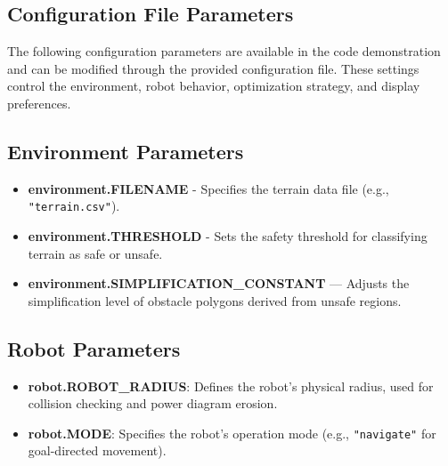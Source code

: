 \begin{appendices}




\chapter{Configuration File Parameters}

The following configuration parameters are available in the code demonstration and can be modified through the provided configuration file. These settings control the environment, robot behavior, optimization strategy, and display preferences.

\section*{Environment Parameters}
\begin{itemize}
    \item \textbf{environment.FILENAME} - Specifies the terrain data file (e.g., \texttt{"terrain.csv"}).
    \item \textbf{environment.THRESHOLD} - Sets the safety threshold for classifying terrain as safe or unsafe.
    \item \textbf{environment.SIMPLIFICATION\_CONSTANT} — Adjusts the simplification level of obstacle polygons derived from unsafe regions.
\end{itemize}

\section*{Robot Parameters}
\begin{itemize}
    \item \textbf{robot.ROBOT\_RADIUS}: Defines the robot's physical radius, used for collision checking and power diagram erosion.
    \item \textbf{robot.MODE}: Specifies the robot's operation mode (e.g., \texttt{"navigate"} for goal-directed movement).
\end{itemize}


\end{appendices}
